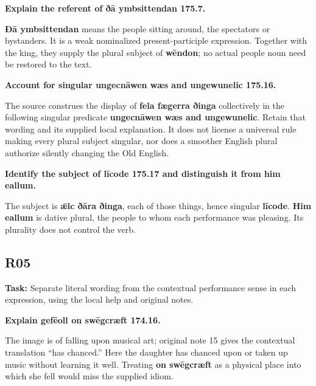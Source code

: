 \textbf{Explain the referent of ðā ymbsittendan 175.7.}

\textbf{Ðā ymbsittendan} means the people sitting around, the spectators or bystanders. It is a weak nominalized present-participle expression. Together with the king, they supply the plural subject of \textbf{wēndon}; no actual people noun need be restored to the text.

\textbf{Account for singular ungecnāwen wæs and ungewunelic 175.16.}

The source construes the display of \textbf{fela fægerra ðinga} collectively in the following singular predicate \textbf{ungecnāwen wæs and ungewunelic}. Retain that wording and its supplied local explanation. It does not license a universal rule making every plural subject singular, nor does a smoother English plural authorize silently changing the Old English.

\textbf{Identify the subject of līcode 175.17 and distinguish it from him eallum.}

The subject is \textbf{ǣlc ðāra ðinga}, each of those things, hence singular \textbf{līcode}. \textbf{Him eallum} is dative plural, the people to whom each performance was pleasing. Its plurality does not control the verb.

\subsection*{R05}

\textbf{Task:} Separate literal wording from the contextual performance sense in each expression, using the local help and original notes.

\textbf{Explain gefēoll on swēgcræft 174.16.}

The image is of falling upon musical art; original note 15 gives the contextual translation “has chanced.” Here the daughter has chanced upon or taken up music without learning it well. Treating \textbf{on swēgcræft} as a physical place into which she fell would miss the supplied idiom.


